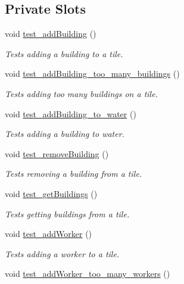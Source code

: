\subsection*{Private Slots}
\begin{DoxyCompactItemize}
\item 
void \hyperlink{classdefault__tile_a43bdf803d694109b43b391aa0420d046}{test\-\_\-add\-Building} ()
\begin{DoxyCompactList}\small\item\em Tests adding a building to a tile. \end{DoxyCompactList}\item 
void \hyperlink{classdefault__tile_a77367549be5fa7a7e0d30da6ef87cb4e}{test\-\_\-add\-Building\-\_\-too\-\_\-many\-\_\-buildings} ()
\begin{DoxyCompactList}\small\item\em Tests adding too many buildings on a tile. \end{DoxyCompactList}\item 
void \hyperlink{classdefault__tile_ac5b6391d1b5eb66bcb20bf17dcbb1c79}{test\-\_\-add\-Building\-\_\-to\-\_\-water} ()
\begin{DoxyCompactList}\small\item\em Tests adding a building to water. \end{DoxyCompactList}\item 
void \hyperlink{classdefault__tile_a692ffdcc135066c0099af99c72073768}{test\-\_\-remove\-Building} ()
\begin{DoxyCompactList}\small\item\em Tests removing a building from a tile. \end{DoxyCompactList}\item 
void \hyperlink{classdefault__tile_a3af682c7eb40ea93a2c99abc55a9b45e}{test\-\_\-get\-Buildings} ()
\begin{DoxyCompactList}\small\item\em Tests getting buildings from a tile. \end{DoxyCompactList}\item 
void \hyperlink{classdefault__tile_ac2868337bc13dea171895916e375a0d8}{test\-\_\-add\-Worker} ()
\begin{DoxyCompactList}\small\item\em Tests adding a worker to a tile. \end{DoxyCompactList}\item 
void \hyperlink{classdefault__tile_af65fe1d9ce7dfe3706b434cf7650eb06}{test\-\_\-add\-Worker\-\_\-too\-\_\-many\-\_\-workers} ()

\end{DoxyCompactItemize}
